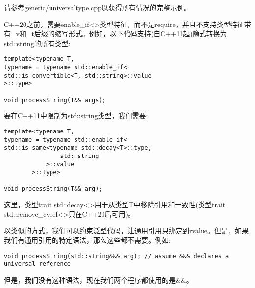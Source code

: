 请参考generic/universaltype.cpp以获得所有情况的完整示例。\par

C++20之前，需要enable\_if<>类型特征，而不是require，并且不支持类型特征带有\_v和\_t后缀的缩写形式。例如，以下代码支持(自C++11起)隐式转换为std::string的所有类型:\par

\begin{lstlisting}[caption={}]
template<typename T,
typename = typename std::enable_if<
std::is_convertible<T, std::string>::value
>::type>

void processString(T&& args);
\end{lstlisting}

要在C++11中限制为std::string类型，我们需要:\par

\begin{lstlisting}[caption={}]
template<typename T,
typename = typename std::enable_if<
std::is_same<typename std::decay<T>::type,
				std::string
			>::value
		>::type>

void processString(T&& arg);
\end{lstlisting}

这里，类型trait std::decay<>用于从类型T中移除引用和一致性(类型trait std::remove\_cvref<>只在C++20后可用)。\par

以类似的方式，我们可以约束泛型代码，让通用引用只绑定到rvalue。但是，如果我们有通用引用的特定语法，那么这些都不需要。例如:\par

\begin{lstlisting}[caption={}]
void processString(std::string&&& arg); // assume &&& declares a universal reference
\end{lstlisting}

但是，我们没有这种语法，现在我们两个程序都使用的是\&\&。\par




























